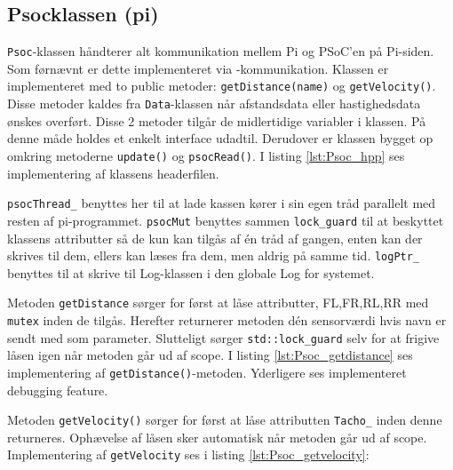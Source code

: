 \subsection{Psocklassen (pi)}

\texttt{Psoc}-klassen håndterer alt kommunikation mellem Pi og PSoC'en på Pi-siden. Som førnævnt er dette implementeret via \IIC-kommunikation. Klassen er implementeret med to public metoder: \texttt{getDistance(name)} og \texttt{getVelocity()}. Disse metoder kaldes fra \texttt{Data}-klassen når afstandsdata eller hastighedsdata ønskes overført. Disse 2 metoder tilgår de midlertidige variabler i klassen. På denne måde holdes et enkelt interface udadtil. Derudover er klassen bygget op omkring metoderne \texttt{update()} og \texttt{psocRead()}. I listing \ref{lst:Psoc_hpp} ses implementering af klassens headerfilen.


	
	
\texttt{psocThread\_} benyttes her til at lade kassen kører i sin egen tråd parallelt med resten af pi-programmet. \texttt{psocMut} benyttes sammen \texttt{lock\_guard} til at beskyttet klassens attributter så de kun kan tilgås af én tråd af gangen, enten kan der skrives til dem, ellers kan læses fra dem, men aldrig på samme tid. \texttt{logPtr\_} benyttes til at skrive til Log-klassen i den globale Log for systemet.


Metoden \texttt{getDistance} sørger for først at låse attributter, FL,FR,RL,RR med \texttt{mutex} inden de tilgås. Herefter returnerer metoden dén sensorværdi hvis navn er sendt med som parameter. Slutteligt sørger \texttt{std::lock\_guard} selv for at frigive låsen igen når metoden går ud af scope. I listing \ref{lst:Psoc_getdistance} ses implementering af \texttt{getDistance()}-metoden. Yderligere ses implementeret debugging feature.


	

Metoden \texttt{getVelocity()} sørger for først at låse attributten \texttt{Tacho\_} inden denne returneres. Ophævelse af låsen sker automatisk når metoden går ud af scope. Implementering af \texttt{getVelocity} ses i listing \ref{lst:Psoc_getvelocity}:




